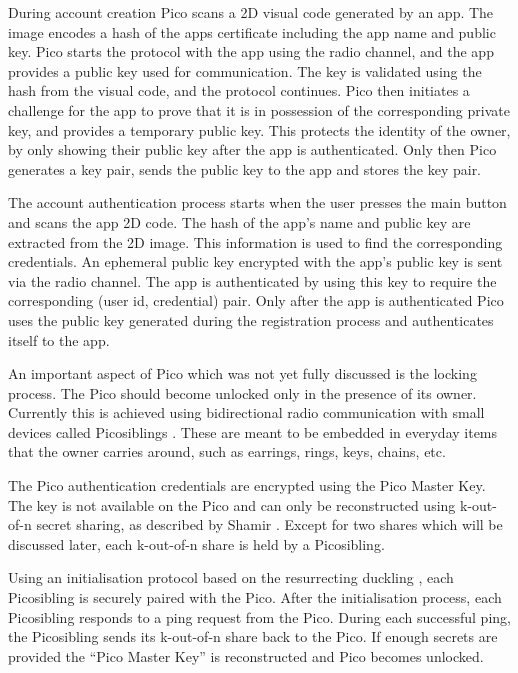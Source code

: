 During account creation Pico scans a 2D visual code generated by an app. The image encodes a hash of the apps certificate including the app name and public key. Pico starts the protocol with the app using the radio channel, and the app provides a public key used for communication. The key is validated using the hash from the visual code, and the protocol continues. Pico then initiates a challenge for the app to prove that it is in possession of the corresponding private key, and provides a temporary public key. This protects the identity of the owner, by only showing their public key after the app is authenticated. Only then Pico generates a key pair, sends the public key to the app and stores the key pair.

The account authentication process starts when the user presses the main button and scans the app 2D code. The hash of the app's name and public key are extracted from the 2D image. This information is used to find the corresponding credentials. An ephemeral public key encrypted with the app's public key is sent via the radio channel. The app is authenticated by using this key to require the corresponding (user id, credential) pair. Only after the app is authenticated Pico uses the public key generated during the registration process and authenticates itself to the app.

An important aspect of Pico which was not yet fully discussed is the locking process. The Pico should become unlocked only in the presence of its owner. Currently this is achieved using bidirectional radio communication with small devices called Picosiblings \cite{stannard2012good}. These are meant to be embedded in everyday items that the owner carries around, such as earrings, rings, keys, chains, etc.

The Pico authentication credentials are encrypted using the Pico Master Key. The key is not available on the Pico and can only be reconstructed using k-out-of-n secret sharing, as described by Shamir \cite{shamir1979share}. Except for two shares which will be discussed later, each k-out-of-n share is held by a Picosibling. 

Using an initialisation protocol based on the resurrecting duckling \cite{stajano2000resurrecting}, each Picosibling is securely paired with the Pico. After the initialisation process, each Picosibling responds to a ping request from the Pico. During each successful ping, the Picosibling sends its k-out-of-n share back to the Pico. If enough secrets are provided the ``Pico Master Key'' is reconstructed and Pico becomes unlocked.

